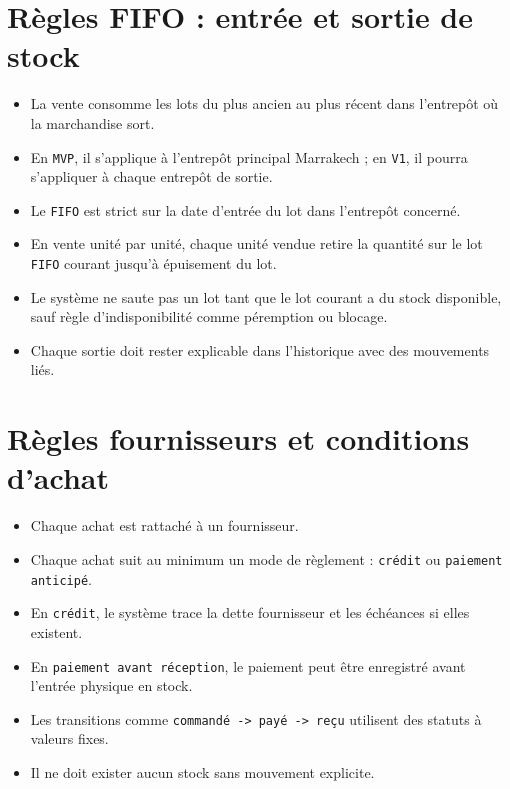 \documentclass[11pt,a4paper]{scrreprt}
\newcommand{\code}[1]{\texttt{#1}}
\begin{document}
\section{Règles FIFO : entrée et sortie de stock}
\begin{businessrulebox}
\begin{itemize}
  \item La vente consomme les lots du plus ancien au plus récent dans l'entrepôt où la marchandise sort.
  \item \highlight{Le \code{FIFO} est local.} En \code{MVP}, il s'applique à l'entrepôt principal Marrakech ; en \code{V1}, il pourra s'appliquer à chaque entrepôt de sortie.
  \item Le \code{FIFO} est strict sur la date d'entrée du lot dans l'entrepôt concerné.
  \item En vente unité par unité, chaque unité vendue retire la quantité sur le lot \code{FIFO} courant jusqu'à épuisement du lot.
  \item Le système ne saute pas un lot tant que le lot courant a du stock disponible, sauf règle d'indisponibilité comme péremption ou blocage.
  \item Chaque sortie doit rester explicable dans l'historique avec des mouvements liés.
\end{itemize}
\end{businessrulebox}

\section{Règles fournisseurs et conditions d'achat}
\begin{businessrulebox}
\begin{itemize}
  \item Chaque achat est rattaché à un fournisseur.
  \item Chaque achat suit au minimum un mode de règlement : \code{crédit} ou \code{paiement anticipé}.
  \item En \code{crédit}, le système trace la dette fournisseur et les échéances si elles existent.
  \item En \code{paiement avant réception}, le paiement peut être enregistré avant l'entrée physique en stock.
  \item Les transitions comme \code{commandé -> payé -> reçu} utilisent des statuts à valeurs fixes.
  \item Il ne doit exister aucun stock sans mouvement explicite.
\end{itemize}
\end{businessrulebox}
\end{document}
